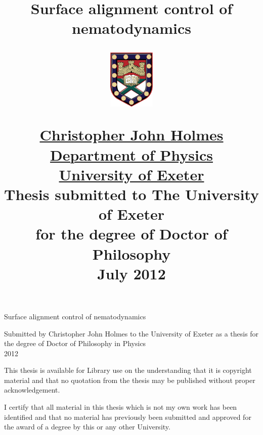\title{
\huge{\textbf{Surface alignment control of nematodynamics}}\\[1.2cm]
\vspace{0.3in}
\begin{figure}[h]
\begin{center}
\includegraphics[width=0.2\textwidth]{figures/crest}
\end{center}
\end{figure}
\vspace{0.2in}
\large{\href{mailto:c.holmes4@gmail.com}{Christopher John Holmes}}\\
\href{http://emps.exeter.ac.uk/physics-astronomy/}{Department of Physics}\\
\href{http://www.ex.ac.uk}{University of Exeter}\\
\vspace{0.5in}
\Large{Thesis submitted to The University of Exeter \\
for the degree of Doctor of Philosophy} \\[1cm]
\Large{July 2012} }
\author{} \date{}
\maketitle

\newpage
\begin{center}
\thispagestyle{empty}
\vspace*{3cm}
\LARGE{Surface alignment control of nematodynamics}

\vspace*{2cm} {\large Submitted by Christopher John Holmes to the University of Exeter as a thesis for the degree of Doctor of Philosophy in Physics\\ 2012}

\end{center}

\vspace{2cm} {This thesis is available for Library use on the understanding that it is copyright material and that no quotation from the thesis may be published without proper acknowledgement.}

\vspace{1cm} {I certify that all material in this thesis which is not my own work has been identified and that no material has previously been submitted and approved for the award of a degree by this or any other University.}

